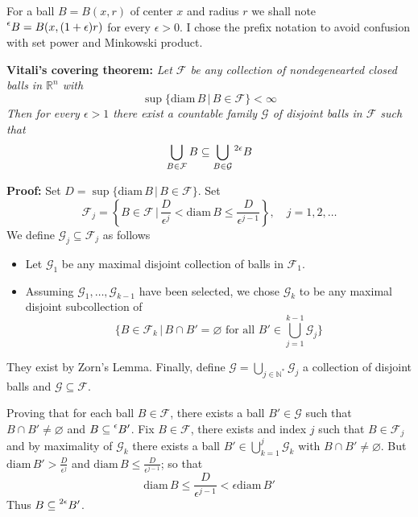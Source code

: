 \documentclass{article}
\begin{document}
\vspace{2ex}
For a ball $B=B(x, r)$ of center $x$ and radius $r$ we shall note $\prescript{\epsilon}{}B
=B(x, (1+\epsilon)r)$ for every $\epsilon>0$. I chose the prefix notation to
avoid confusion with set power and Minkowski product.

\vspace{1ex}
\textbf{Vitali's covering theorem:} \textit{
Let $\mathcal{F}$ be any collection of nondegenearted closed balls in
$\mathbb{R}^n$ with
\[ \sup\{\text{diam}\,B\,|\, B\in\mathcal{F}\}<\infty \]
Then for every $\epsilon>1$ there exist a countable family $\mathcal{G}$ of
disjoint balls in $\mathcal{F}$ such that
\[\bigcup_{B\in\mathcal{F}}B\subseteq\bigcup_{B\in\mathcal{G}}\prescript{2\epsilon}{}B\]}

\vspace{1ex}
\textbf{Proof:}
Set $D=\sup\{\text{diam}\,B\,|\,B\in \mathcal{F}\}$. Set
\[\mathcal{F}_j=\left\{B\in\mathcal{F}\,|\,\frac{D}{\epsilon^j}<\text{diam}\,B\leq\frac{D}{\epsilon^{j-1}}\right\},\quad j=1,2,\ldots\]
We define $\mathcal{G}_j\subseteq\mathcal{F}_j$ as follows
\begin{itemize}
    \item Let $\mathcal{G}_1$ be any maximal disjoint collection of balls in
        $\mathcal{F}_1$.

    \item Assuming $\mathcal{G}_1,\ldots,\mathcal{G}_{k-1}$ have been selected,
        we chose $\mathcal{G}_k$ to be any maximal disjoint subcollection of
        \[ \{B\in\mathcal{F}_k\,|\,B\cap B'=\varnothing\text{ for all }B'\in\bigcup_{j=1}^{k-1}\mathcal{G}_j\}\]
\end{itemize}
They exist by Zorn's Lemma. Finally, define $\mathcal{G}=\bigcup_{j\in\mathbb{N}^*}\mathcal{G}_j$
a collection of disjoint balls and $\mathcal{G}\subseteq\mathcal{F}$.

\vspace{1ex}
Proving that for each ball $B\in\mathcal{F}$, there exists a ball $B'\in\mathcal{G}$
such that $B\cap B'\neq\varnothing$ and $B\subseteq\prescript{\epsilon}{}B'$. Fix
$B\in\mathcal{F}$, there exists and index $j$ such that $B\in\mathcal{F}_j$ and
by maximality of $\mathcal{G}_k$ there exists a ball $B'\in\bigcup_{k=1}^j
\mathcal{G}_k$ with $B\cap B'\neq\varnothing$. But $\text{diam}\,B'>\frac{D}{\epsilon^j}$
and $\text{diam}\,B\leq\frac{D}{\epsilon^{j-1}}$; so that
\[ \text{diam}\,B\leq \frac{D}{\epsilon^{j-1}} < \epsilon\text{diam}\,B'\]
Thus $B\subseteq\prescript{2\epsilon}{}B'$.
\end{document}
